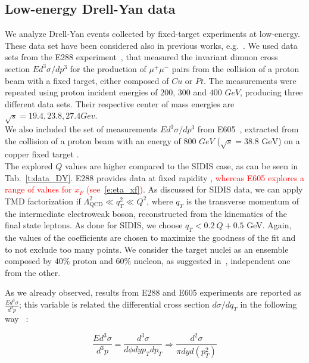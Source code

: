 \documentclass[aps,preprintnumbers,showpacs,nofootinbib,superscriptaddress,floatfix]{revtex4}
\begin{document}
\subsection{Low-energy Drell-Yan data}
\label{ss:dy}

We analyze Drell-Yan events collected by fixed-target experiments at low-energy. These data set have been considered also in previous works, e.g.~\cite{DAlesio:2014mrz}. 
We used data sets from the E288 experiment~\cite{Ito:1980ev}, that measured the invariant dimuon cross section $E d^3\sigma / dp^3$ for the production of $\mu^+ \mu^-$ pairs from the collision of a proton beam with a fixed target, either composed of $Cu$ or $Pt$.
The measurements were repeated using proton incident energies of $200$, $300$ and $400$ $GeV$, producing three different data sets.
Their respective center of mass energies are $\sqrt{s}=19.4,23.8,27.4 Gev$.\\
We also included the set of measurements $E d^3\sigma / dp^3$ from E605~\cite{Moreno:1990sf}, extracted from the collision of a proton beam with an energy of $800$ $GeV$ ($\sqrt{s}=38.8 \text{ GeV}$) on a copper fixed target .\\

The explored $Q$ values are higher compared to the SIDIS case, as can be seen in Tab.~\ref{t:data_DY}. E288 provides data at fixed rapidity ,\textcolor{red}{ whereas E605 explores a range of values for $x_F$ (see~\eqref{e:eta_xf})}.  
As discussed for SIDIS data, we can apply TMD factorization if $\Lambda_{\text{QCD}}^2 \ll q_T^2 \ll Q^2$, where $q_T$ is the transverse momentum of the intermediate electroweak boson, reconstructed from the kinematics of the final state leptons. As done for SIDIS, we choose $q_T < 0.2\ Q + 0.5$ GeV. Again, the values of the coefficients are chosen to maximize the goodness of the fit and to not exclude too many points.
We consider the target nuclei as an ensemble composed by $40\%$ proton and $60\%$ nucleon, as suggested in~\cite{Ito:1980ev}, independent one from the other.

As we already observed, results from E288 and E605 experiments are reported as $\frac{Ed^3\sigma}{d^3p}$; this variable is related the differential cross section $d\sigma/dq_T$ in the following way~\cite{Olive:2016xmw} :

\begin{equation}
\frac{Ed^3\sigma}{d^3p}=\frac{d^3\sigma}{d\phi dy p_T dp_T} \Rightarrow \frac{d^2\sigma}{\pi dy d(p^2_T)}
\end{equation}
\end{document}
